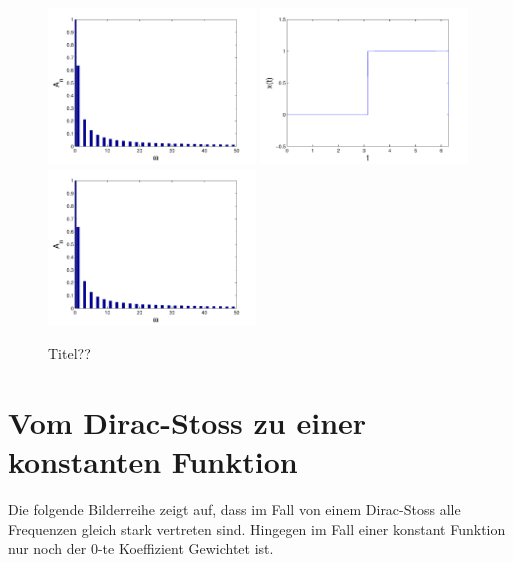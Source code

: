 \begin{refsection}
\begin{figure}
\includegraphics[width=0.49\textwidth]{kugel/kSpektrum/Rechteck3_2.pdf}
\includegraphics[width=0.49\textwidth]{kugel/kSpektrum/Rechteck4_1.pdf}
\includegraphics[width=0.49\textwidth]{kugel/kSpektrum/Rechteck4_2.pdf}
\caption{Titel??
\label{skript:Spektrum1}}
\end{figure}
\section{Vom Dirac-Stoss zu einer konstanten Funktion}

Die folgende Bilderreihe zeigt auf, dass im Fall von einem Dirac-Stoss alle Frequenzen gleich stark vertreten sind. Hingegen im Fall einer konstant Funktion nur noch der 0-te Koeffizient Gewichtet ist.


\end{refsection}
